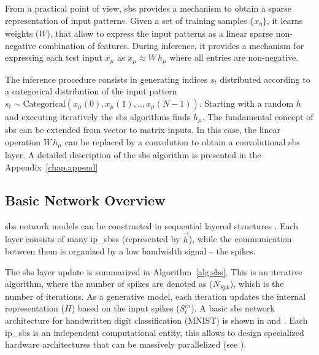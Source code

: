 From a practical point of view, \gls{sbs} provides a mechanism to obtain a sparse representation of input patterns. Given a set of
	training samples $\{x_\eta\}$, it learns weights ($W$), that allow
	to express the input patterns as a linear sparse non-negative combination
	of features.  During inference, it provides a mechanism for expressing
	each test input $x_\mu$ as $x_\mu \approx W\, h_\mu$ where all
	entries are non-negative.
	
	The inference procedure consists in generating indices $s_t$
	distributed according to a categorical distribution of the input pattern
	$s_t \sim \mathrm{Categorical}(x_{\mu}(0), x_{\mu}(1), ..,
	x_{\mu}(N-1))$. Starting with a random $h$ and executing
	iteratively  the \gls{sbs} algorithms finds
	$h_{\mu}$. The fundamental concept of \gls{sbs} can be extended from vector to matrix
	inputs. In this case, the linear operation $W\, h_\mu$ can be replaced by a
	convolution to obtain a convolutional \gls{sbs} layer. A detailed description of the \gls{sbs} algorithm is presented in the Appendix~\ref{chap.append}

\subsection{Basic Network Overview}

\gls{sbs} network models can be constructed in sequential layered structures \cite{rotermund2019Backpropagation}. Each layer consists of many \glspl{ip_sbs} (represented by $\vec{h}$), while the communication between them is organized by a low bandwidth signal -- the spikes.

The \gls{sbs} layer update is summarized in Algorithm~\ref{alg:sbs}. This is an iterative algorithm, where the number of spikes are denoted as ($N_{Spk}$), which is the number of iterations. As a generative model, each iteration updates the internal representation ($H$) based on the input spikes ($S^{in}_t$). A basic \gls{sbs} network architecture for handwritten digit classification (MNIST) is shown in  and . Each \gls{ip_sbs} is an independent computational entity, this allows to design specialized hardware architectures that can be massively parallelized (see ).


